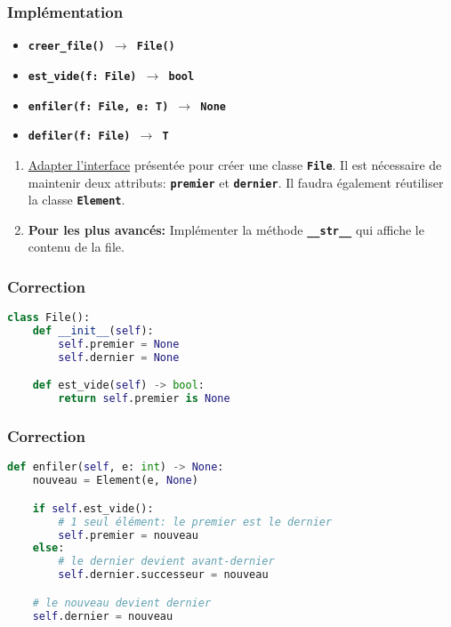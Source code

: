\documentclass[svgnames,11pt]{beamer}
\begin{document}
\begin{frame}
    \frametitle{Implémentation}

    \begin{itemize}
        \item \texttt{\textbf{creer\_file() $\rightarrow$ File()}}
        \item \texttt{\textbf{est\_vide(f: File) $\rightarrow$ bool}}
        \item \texttt{\textbf{enfiler(f: File, e: T) $\rightarrow$ None}}
        \item \texttt{\textbf{defiler(f: File) $\rightarrow$ T}}
        \end{itemize}

        \begin{activite}
            \begin{enumerate}
                \item \underline{Adapter l'interface} présentée pour créer une classe \textbf{\texttt{File}}. Il est nécessaire de maintenir deux attributs: \textbf{\texttt{premier}} et \textbf{\texttt{dernier}}. Il faudra également réutiliser la classe \textbf{\texttt{Element}}.
                \item \textbf{Pour les plus avancés:} Implémenter la méthode \textbf{\texttt{\_\_str\_\_}} qui affiche le contenu de la file.
            \end{enumerate}
        \end{activite}
\end{frame}
\begin{frame}[fragile]
    \frametitle{Correction}

\begin{lstlisting}[language=Python , basicstyle=\ttfamily\small, xleftmargin=2em, xrightmargin=2em]
class File():
    def __init__(self):
        self.premier = None
        self.dernier = None

    def est_vide(self) -> bool:
        return self.premier is None
\end{lstlisting}

\end{frame}
\begin{frame}[fragile]
    \frametitle{Correction}

\begin{lstlisting}[language=Python , basicstyle=\ttfamily\small, xleftmargin=2em, xrightmargin=2em]
def enfiler(self, e: int) -> None:
    nouveau = Element(e, None)

    if self.est_vide():
        # 1 seul élément: le premier est le dernier
        self.premier = nouveau
    else:
        # le dernier devient avant-dernier
        self.dernier.successeur = nouveau

    # le nouveau devient dernier
    self.dernier = nouveau
\end{lstlisting}

\end{frame}
\end{document}
